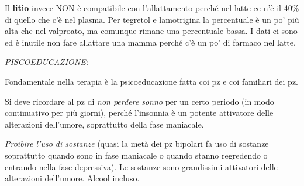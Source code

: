\begin{itemize}
\begin{itemize}
  Il \textbf{litio} invece NON è compatibile con l'allattamento perché
  nel latte ce n'è il 40\% di quello che c'è nel plasma. Per tegretol e
  lamotrigina la percentuale è un po' più alta che nel valproato, ma
  comunque rimane una percentuale bassa. I dati ci sono ed è inutile non
  fare allattare una mamma perché c'è un po' di farmaco nel latte.
\end{itemize}

\emph{PISCOEDUCAZIONE:}

Fondamentale nella terapia è la psicoeducazione fatta coi pz e coi
familiari dei pz.

Si deve ricordare al pz di \emph{non perdere sonno} per un certo periodo
(in modo continuativo per più giorni), perché l'insonnia è un potente
attivatore delle alterazioni dell'umore, soprattutto della fase
maniacale.

\emph{Proibire l'uso di sostanze} (quasi la metà dei pz bipolari fa uso
di sostanze soprattutto quando sono in fase maniacale o quando stanno
regredendo o entrando nella fase depressiva). Le sostanze sono
grandissimi attivatori delle alterazioni dell'umore. Alcool incluso.

\end{itemize}
